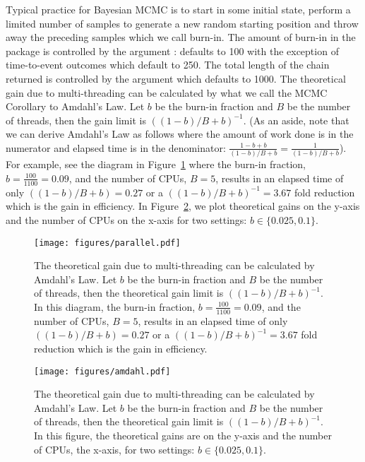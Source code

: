 \documentclass[article]{jss}
\begin{document}
Typical practice for Bayesian MCMC is to start in some initial state,
perform a limited number of samples to generate a new random starting
position and throw away the preceding samples which we call burn-in.
The amount of burn-in in the  package is controlled by the
argument : defaults to 100 with the exception of
time-to-event outcomes which default to 250.  The total
length of the chain returned is controlled by the argument
 which defaults to 1000.  The theoretical gain due to
multi-threading can be calculated by what we call the MCMC Corollary
to Amdahl's Law.  Let $b$ be the burn-in fraction and $B$ be the
number of threads, then the gain limit is $((1-b)/B+b)^{-1}$.  (As an
aside, note that we can derive Amdahl's Law as follows where the
amount of work done is in the numerator and elapsed time is in the
denominator: $\frac{1-b+b}{(1-b)/B+b}=\frac{1}{(1-b)/B+b}$).  For
example, see the diagram in Figure~\ref{MCMC} where the burn-in
fraction, $b=\frac{100}{1100}=0.09$, and the number of CPUs, $B=5$,
results in an elapsed time of only $((1-b)/B+b)=0.27$ or a
$((1-b)/B+b)^{-1}=3.67$ fold reduction which is the gain in
efficiency.  In Figure~\ref{Amdahl}, we plot theoretical gains
on the y-axis and the number of CPUs on the x-axis
for two settings: $b \in \{0.025, 0.1\}$.
\begin{figure}%
\begin{center}
\texttt{[image: figures/parallel.pdf]}
\end{center}
\caption{\label{MCMC}The theoretical gain due to multi-threading can
  be calculated by Amdahl's Law.  Let $b$ be the burn-in fraction and
  $B$ be the number of threads, then the theoretical gain limit is
  $((1-b)/B+b)^{-1}$.  In this diagram, the burn-in fraction,
  $b=\frac{100}{1100}=0.09$, and the number of CPUs, $B=5$, results in
  an elapsed time of only $((1-b)/B+b)=0.27$ or a
  $((1-b)/B+b)^{-1}=3.67$ fold reduction which is the gain in
  efficiency.  }
\end{figure}

\begin{figure}%
\begin{center}
\texttt{[image: figures/amdahl.pdf]}
\end{center}
\caption{\label{Amdahl}The theoretical gain due to multi-threading can
  be calculated by Amdahl's Law.  Let $b$ be the burn-in fraction and
  $B$ be the number of threads, then the theoretical gain limit is
  $((1-b)/B+b)^{-1}$.  In this figure, the theoretical gains are on
  the y-axis and the number of CPUs, the x-axis, for two settings:
  $b \in \{0.025, 0.1\}$.  }
\end{figure}
\end{document}
